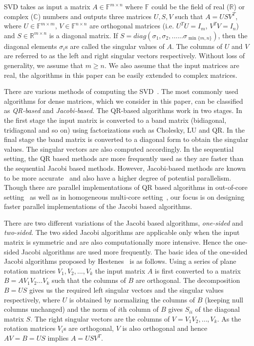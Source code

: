 \documentclass[10pt, conference, compsocconf]{IEEEtran}
\begin{document}
SVD takes as input a matrix $A \in \mathbb{F}^{m \times n}$ where $\mathbb{F}$ could be the field of real ($\mathbb{R}$) or complex ($\mathbb{C}$) numbers and outputs three matrices $U, S, V$ such that $A = USV^T$, where $U \in \mathbb{F}^{m \times m}$, $V \in \mathbb{F}^{n \times n}$ are orthogonal matrices (i.e. $U^TU = I_m$, $V^TV = I_n$) and $S \in \mathbb{R}^{m \times n}$ is a diagonal matrix. If $S = diag(\sigma_1, \sigma_2,......\sigma_{\min\{m,n\}})$, then the diagonal elements $\sigma_i$s are called the singular values of $A$. The columns of $U$ and $V$ are referred to as the left and right singular vectors respectively. Without loss of generality, we assume that $m \ge n$. We also assume that the input matrices are real, the algorithms in this paper can be easily extended to complex matrices. 

There are various methods of computing the SVD~\cite{golub2012matrix}. The most commonly used algorithms for dense matrices, which we consider in this paper, can be classified as \emph{QR-based} and \emph{Jacobi-based}. The QR-based algorithms work in two stages. In the first stage the input matrix is converted to a band matrix (bidiagonal, tridiagonal and so on) using factorizations such as Cholesky, LU and QR. In the final stage the band matrix is converted to a diagonal form to obtain the singular values. The singular vectors are also computed accordingly. In the sequential setting, the QR based methods are more frequently used as they are faster than the sequential Jacobi based methods. However, Jacobi-based methods are known to be more accurate~\cite{demmel1992jacobi} and also have a higher degree of potential parallelism. Though there are parallel implementations of QR based algorithms in out-of-core setting~\cite{grimes1987solution, grimes1988solution} as well as in homogeneous multi-core setting~\cite{haidar2013improved}, our focus is on designing faster parallel implementations of the Jacobi based algorithms.

There are two different variations of the Jacobi based algorithms, \emph{one-sided} and \emph{two-sided}. The two sided Jacobi algorithms are applicable only when the input matrix is symmetric and are also computationally more intensive. Hence the one-sided Jacobi algorithms are used more frequently. The basic idea of the one-sided Jacobi algorithms proposed by Hestenes~\cite{hestenes1958inversion} is as follows. Using a series of plane rotation matrices $V_1, V_2, \ldots, V_k$ the input matrix $A$ is first converted to a matrix $B=AV_1V_2\ldots V_k$ such that the columns of $B$ are orthogonal. The decomposition $B = US$ gives us the required left singular vectors and the singular values respectively, where $U$ is obtained by normalizing the columns of $B$ (keeping null columns unchanged) and the norm of $i$th column of $B$ gives $S_{ii}$ of the diagonal matrix $S$. The right singular vectors are the columns of $V=V_1V_2,\ldots,V_k$. As the rotation matrices $V_i$s are orthogonal, $V$ is also orthogonal and hence $AV = B = US$ implies $A = USV^T$.
\end{document}
